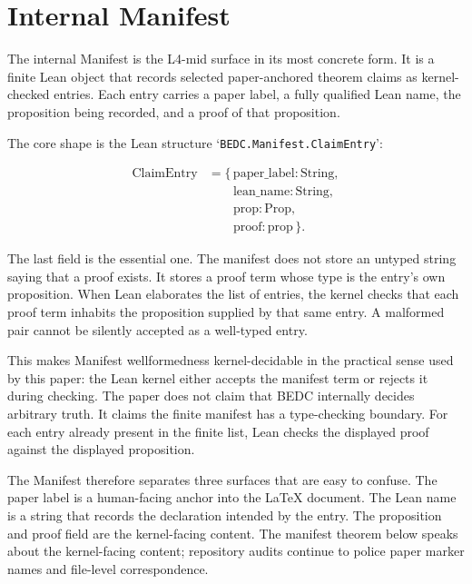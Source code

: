 \section{Internal Manifest}\label{sec:self-comp-manifest}

The internal Manifest is the L4-mid surface in its most concrete form. It is a
finite Lean object that records selected paper-anchored theorem claims as
kernel-checked entries. Each entry carries a paper label, a fully qualified Lean
name, the proposition being recorded, and a proof of that proposition.

The core shape is the Lean structure `\verb|BEDC.Manifest.ClaimEntry|':

$$
\begin{aligned}
\mathrm{ClaimEntry}
  &= \{\,\mathrm{paper\_label} : \mathrm{String},\\
  &\qquad \mathrm{lean\_name} : \mathrm{String},\\
  &\qquad \mathrm{prop} : \mathrm{Prop},\\
  &\qquad \mathrm{proof} : \mathrm{prop}\,\}.
\end{aligned}
$$

The last field is the essential one. The manifest does not store an untyped
string saying that a proof exists. It stores a proof term whose type is the
entry's own proposition. When Lean elaborates the list of entries, the kernel
checks that each proof term inhabits the proposition supplied by that same
entry. A malformed pair cannot be silently accepted as a well-typed entry.

This makes Manifest wellformedness kernel-decidable in the practical sense used
by this paper: the Lean kernel either accepts the manifest term or rejects it
during checking. The paper does not claim that BEDC internally decides arbitrary
truth. It claims the finite manifest has a type-checking boundary. For each
entry already present in the finite list, Lean checks the displayed proof
against the displayed proposition.

The Manifest therefore separates three surfaces that are easy to confuse. The
paper label is a human-facing anchor into the LaTeX document. The Lean name is a
string that records the declaration intended by the entry. The proposition and
proof field are the kernel-facing content. The manifest theorem below speaks
about the kernel-facing content; repository audits continue to police paper
marker names and file-level correspondence.


